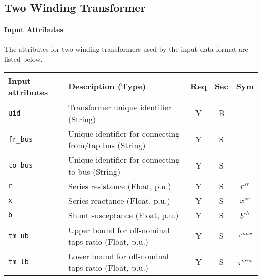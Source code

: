 \documentclass{article}
\begin{document}
\subsection{Two Winding Transformer}
\label{nom:transformer}

\paragraph{Input Attributes}
The attributes for two winding transformers used by the
input data format are listed below.

\begin{center}
\small
\begin{tabular}{ l | l | c | c | c |}
Input attributes & Description (Type) & Req & Sec & Sym\\
\hline
  {\tt uid} & Transformer unique identifier (String)& Y & B & \\
  {\tt fr\_bus} & Unique identifier for connecting from/tap bus (String)& Y & S & \\
  {\tt to\_bus} & Unique identifier for connecting to bus (String)& Y & S & \\
  {\tt r} & Series resistance (Float, p.u.)& Y & S & $r^{sr}$\\
  {\tt x} & Series reactance  (Float, p.u.)& Y & S & $x^{sr}$\\
  {\tt b} & Shunt susceptance (Float, p.u.)& Y & S & $b^{ch}$ \\
  {\tt tm\_ub} & Upper bound for off-nominal taps ratio (Float, p.u.)& Y & S & $\tau^{max}$\\
  {\tt tm\_lb} & Lower bound for off-nominal taps ratio (Float, p.u.)& Y & S & $\tau^{min}$\\

\end{tabular}
\end{center}
\end{document}
